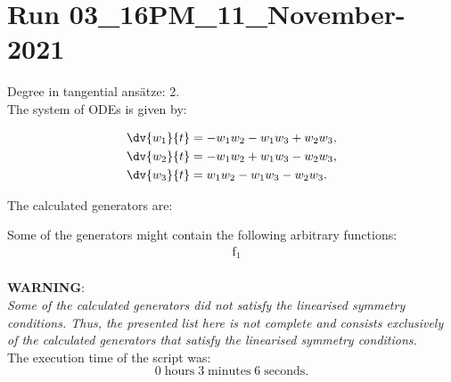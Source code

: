 \section*{Run 03\_16PM\_11\_November-2021}
Degree in tangential ansätze:	2.\\
The system of ODEs is given by:

\begin{align*}
\dv{w_{1}}{t}&=- w_{1} w_{2} - w_{1} w_{3} + w_{2} w_{3},\\
\dv{w_{2}}{t}&=- w_{1} w_{2} + w_{1} w_{3} - w_{2} w_{3},\\
\dv{w_{3}}{t}&=w_{1} w_{2} - w_{1} w_{3} - w_{2} w_{3}.\\
\end{align*}

\noindent The calculated generators are:



\noindent Some of the generators might contain the following arbitrary functions:
\begin{align*}
&\operatorname{f_{1}}\\
\end{align*}

\noindent\huge\textbf{WARNING}:\\
\noindent\Large\textit{Some of the calculated generators did not satisfy the linearised symmetry conditions. Thus, the presented list here is not complete and consists exclusively of the calculated generators that satisfy the linearised symmetry conditions.}\normalsize\\[2cm]
\noindent The execution time of the script was:
$$0\;\mathrm{hours}\;3\;\mathrm{minutes}\;6 \;\mathrm{seconds}.$$
